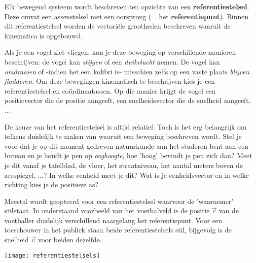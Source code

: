 \documentclass{ximera}
\begin{document}
	\author{Bart Lambregs}
    \xmsource\xmuitleg


Elk bewegend systeem wordt beschreven ten opzichte van een \textbf{referentiestelsel}. Deze omvat een assenstelsel met een oorsprong (= het \textbf{referentiepunt}).
Binnen dit referentiestelsel worden de vectoriële grootheden beschreven waaruit de kinematica is opgebouwd. 
 
Als je een vogel ziet vliegen, kan je deze beweging op verschillende manieren beschrijven: de vogel kan \textit{stijgen} of een \textit{duikvlucht} nemen. 
De vogel kan \textit{omdraaien} of -indien het een kolibri is- misschien zelfs op een vaste plaats \textit{blijven fladderen}. 
Om deze bewegingen kinematisch te beschrijven kies je een referentiestelsel en coördinaatassen. %
Op die manier krijgt de vogel een positievector die de positie aangeeft, een snelheidsvector die de snelheid aangeeft, ... 

De keuze van het referentiestelsel is altijd relatief. Toch is het erg belangrijk om telkens duidelijk te maken van waaruit een beweging beschreven wordt.
Stel je voor dat je op dit moment gedreven natuurkunde aan het studeren bent aan een bureau en je houdt je pen op \textit{ooghoogte}, hoe 'hoog' bevindt je pen zich dan? Meet je dit vanaf je tafelblad, de vloer, het straatniveau, het aantal meters boven de zeespiegel, ...? In welke eenheid meet je dit? Wat is je eenheidsvector en in welke richting kies je de positieve as? 

Meestal wordt geopteerd voor een referentiestelsel waarvoor de 'waarnemer' stilstaat. %
In onderstaand voorbeeld van het voetbalveld is de positie \(\vec{r}\) van de voetballer duidelijk verschillend naargelang het referentiepunt.
Voor een toeschouwer in het publiek staan beide referentiestelsels stil, bijgevolg is de snelheid \(\vec{v}\) voor beiden dezelfde.


\begin{center}
\begin{minipage}[t]{0.70\textwidth}
\begin{image}[\linewidth]
	\texttt{[image: referentiestelsels]}
\end{image}
\end{minipage}
\end{center}
\end{document}
